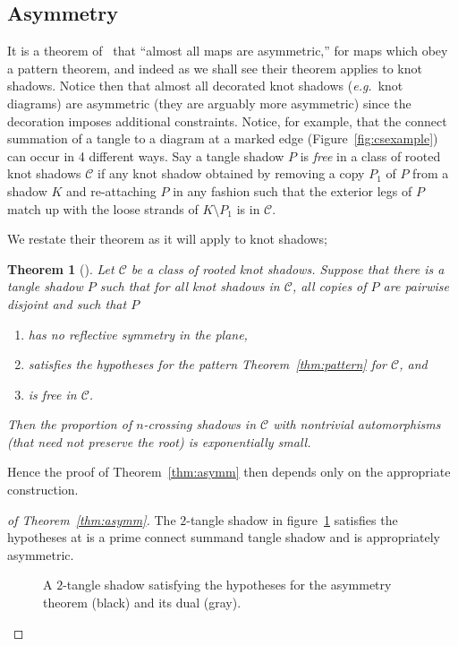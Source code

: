 \documentclass[submission%
]{dmtcs}
\newtheorem*{untheorem}{Theorem}
\begin{document}
\subsection{Asymmetry}
\label{sec:asymmetry}

It is a theorem of~\cite{Richmond19951} that ``almost all maps are
asymmetric,'' for maps which obey a pattern theorem, and indeed as we
shall see their theorem applies to knot shadows. Notice then that
almost all decorated knot shadows (\textit{e.g.}\ knot diagrams) are
asymmetric (they are arguably more asymmetric) since the decoration
imposes additional constraints. Notice, for example, that the connect
summation of a tangle to a diagram at a marked edge
(Figure~\ref{fig:csexample}) can occur in 4 different ways. Say a
tangle shadow $P$ is \emph{free} in a class of rooted knot shadows
$\mathscr{C}$ if any knot shadow obtained by removing a copy $P_1$ of
$P$ from a shadow $K$ and re-attaching $P$ in any fashion such that
the exterior legs of $P$ match up with the loose strands of $K
\setminus P_1$ is in $\mathscr{C}$.

We restate their theorem as it will apply to knot shadows;

\begin{untheorem}[\cite{Richmond19951}]
  Let $\mathscr{C}$ be a class of rooted knot shadows. Suppose that
  there is a tangle shadow $P$ such that for all knot shadows in
  $\mathscr{C}$, all copies of $P$ are pairwise disjoint and such that $P$
  \begin{enumerate}
  \item has no reflective symmetry in the plane,
  \item satisfies the hypotheses for the pattern
    Theorem~\ref{thm:pattern} for $\mathscr{C}$, and
  \item is free in $\mathscr{C}$.
  \end{enumerate}
  Then the proportion of $n$-crossing shadows in $\mathscr{C}$ with
  nontrivial automorphisms (that need not preserve the root) is
  exponentially small.
\end{untheorem}

Hence the proof of Theorem~\ref{thm:asymm} then depends only on the
appropriate construction.

\begin{proof}[of Theorem~\ref{thm:asymm}] The $2$-tangle shadow in
  figure~\ref{fig:asymtangle} satisfies the hypotheses at is a prime
  connect summand tangle shadow and is appropriately asymmetric.
  \begin{figure}[htbp]
    \centering
    
    \caption{A $2$-tangle shadow satisfying the hypotheses for the
      asymmetry theorem (black) and its dual (gray).}
    \label{fig:asymtangle}
  \end{figure}
\end{proof}
\end{document}
